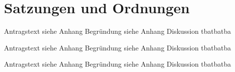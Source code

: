 \section{Satzungen und Ordnungen}

    {
        Antragstext siehe Anhang
    }{
        Begründung siehe Anhang
    }{
        Diskussion
    }{tba}{tba}{tba}

    {
        Antragstext siehe Anhang
    }{
        Begründung siehe Anhang
    }{
        Diskussion
    }{tba}{tba}{tba}
    
    {
        Antragstext siehe Anhang
    }{
        Begründung siehe Anhang
    }{
        Diskussion
    }{tba}{tba}{tba}
